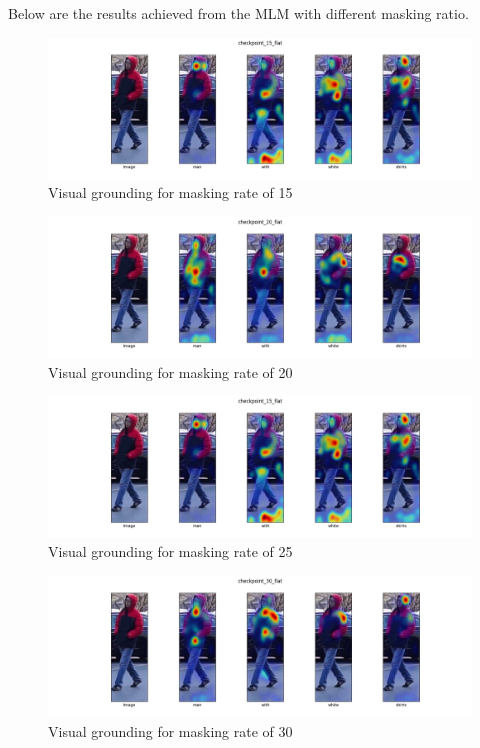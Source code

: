 Below are the results achieved from the MLM with different masking ratio.

\begin{figure}[htbp]
  \includegraphics[width=\linewidth]{img/mlm2/mlm-checkpoint_15_flat.png}
  \caption{Visual grounding for masking rate of 15}
  \label{fig:mlm_1}
\end{figure}

\begin{figure}[htbp]
  \includegraphics[width=\linewidth]{img/mlm2/mlm-checkpoint_20_flat.png}
  \caption{Visual grounding for masking rate of 20}
  \label{fig:mlm_2}
\end{figure}

\begin{figure}[htbp]
  \includegraphics[width=\linewidth]{img/mlm2/mlm-checkpoint_15_flat.png}
  \caption{Visual grounding for masking rate of 25} 
  \label{fig:mlm_3} 
\end{figure}

\begin{figure}[htbp]
  \includegraphics[width=\linewidth]{img/mlm2/mlm-checkpoint_30_flat.png}
  \caption{Visual grounding for masking rate of 30}
  \label{fig:mlm_4}
\end{figure}

